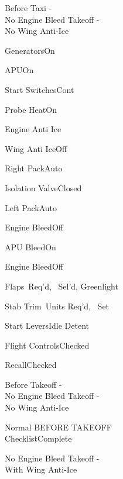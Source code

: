 \documentclass[sim-use, blue_items, halfpage]{checklist}
\begin{document}
\begin{checklist}{Before Taxi -\\No Engine Bleed Takeoff -\\No Wing Anti-Ice}
  \item{Generators}{On}
  \item{APU}{On}
  \item{Start Switches}{Cont}
  \item{Probe Heat}{On}
  \item{Engine Anti Ice}{\blank}
  \item{Wing Anti Ice}{Off}
  \item{Right Pack}{Auto}
  \item{Isolation Valve}{Closed}
  \item{Left Pack}{Auto}
  \item{Engine  Bleed}{Off}
  \item{APU Bleed}{On}
  \item{Engine  Bleed}{Off}
  \item{Flaps}{\blank\ Req'd, \blank\ Sel'd, Greenlight}
  \item{Stab Trim}{\blank\ Units Req'd, \blank\ Set}
  \item{Start Levers}{Idle Detent}
  \item{Flight Controls}{Checked}
  \item{Recall}{Checked}
\end{checklist}

\begin{checklist}{Before Takeoff -\\No Engine Bleed Takeoff -\\No Wing Anti-Ice}
  \item{Normal BEFORE TAKEOFF\\Checklist}{Complete}
\end{checklist}

\begin{checklist}{No Engine Bleed Takeoff -\\With Wing Anti-Ice}
\end{checklist}
\end{document}
